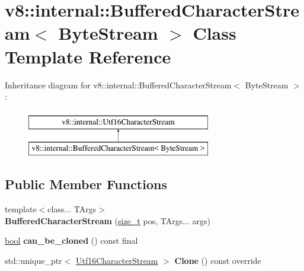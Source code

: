 \hypertarget{classv8_1_1internal_1_1BufferedCharacterStream}{}\section{v8\+:\+:internal\+:\+:Buffered\+Character\+Stream$<$ Byte\+Stream $>$ Class Template Reference}
\label{classv8_1_1internal_1_1BufferedCharacterStream}
Inheritance diagram for v8\+:\+:internal\+:\+:Buffered\+Character\+Stream$<$ Byte\+Stream $>$\+:\begin{figure}[H]
\begin{center}
\leavevmode
\includegraphics[height=2.000000cm]{classv8_1_1internal_1_1BufferedCharacterStream}
\end{center}
\end{figure}
\subsection*{Public Member Functions}
\begin{DoxyCompactItemize}
\item 
\mbox{\label{classv8_1_1internal_1_1BufferedCharacterStream_a872f249600f534f0f0fae98fca2ad94a}} 
{\footnotesize template$<$class... T\+Args$>$ }\\{\bfseries Buffered\+Character\+Stream} (\mbox{\hyperlink{classsize__t}{size\+\_\+t}} pos, T\+Args... args)
\item 
\mbox{\label{classv8_1_1internal_1_1BufferedCharacterStream_a7a67ed84925a265966247281d7b8a5fd}} 
\mbox{\hyperlink{classbool}{bool}} {\bfseries can\+\_\+be\+\_\+cloned} () const final
\item 
\mbox{\label{classv8_1_1internal_1_1BufferedCharacterStream_a3d3e61c8f8542e6f54ac42f802f5e68e}} 
std\+::unique\+\_\+ptr$<$ \mbox{\hyperlink{classv8_1_1internal_1_1Utf16CharacterStream}{Utf16\+Character\+Stream}} $>$ {\bfseries Clone} () const override
\end{DoxyCompactItemize}
